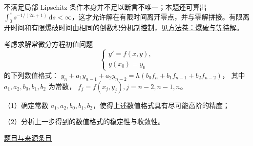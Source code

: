 \documentclass[12pt,fontset=fandol]{ctexart}
\begin{document}
\begin{remark}[方法与条件]不满足局部 Lipschitz 条件本身并不足以断言不唯一；本题还可算出 $\int_0^\varepsilon s^{-1/(2n+1)}\,\mathrm ds<\infty$，这才允许解在有限时间离开零点，并与零解拼接。有限离开时间和有限爆破时间由相同的倒数积分机制控制，见\hyperref[app:dynamics-blowup]{方法卷：爆破与等待解}。\end{remark}

\begin{example}\label{ex:fin12-high:13}\label{pr:fin12-high:13}

考虑求解常微分方程初值问题
\[
\begin{cases} y' = f(x,y), \\ y\left(x_0\right) = y_0 \end{cases}
\]
的下列数值格式：
$y_{n}+a_{1}y_{n-1}+a_{2}y_{n-2}=h\left(b_{0}f_{n}+b_{1}f_{n-1}+b_{2}f_{n-2}\right)$，
其中 $a_{1},a_{2},b_{0},b_{1},b_{2}$ 为常数，
$f_{j}=f\left(x_{j},y_{j}\right),j=n-2,n-1,n$。

（1）确定常数 $a_{1},a_{2},b_{0},b_{1},b_{2}$，使得上述数值格式具有尽可能高阶的精度；

（2）分析上一步得到的数值格式的稳定性与收敛性。

\par\href{https://github.com/lzxcr/cmc-mathematics/blob/64916fa1fdbc3e444a652eca204d5669058ee321/src/problems/finals/12/15.md}{题目与来源条目}

\end{example}
\end{document}
